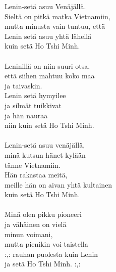 
Lenin-setä asuu Venäjällä. \\ Sieltä on pitkä matka Vietnamiin, \\ mutta minusta vain tuntuu, että \\ Lenin setä asuu yhtä lähellä \\ kuin setä Ho Tshi Minh. \\ \hspace{10mm} \\ Leninillä on niin suuri otsa, \\ että siihen mahtuu koko maa \\ ja taivaskin. \\ Lenin setä hymyilee \\ ja silmät tuikkivat \\ ja hän nauraa \\ niin kuin setä Ho Tshi Minh. \\ \hspace{10mm} \\ Lenin-setä asuu venäjällä, \\ minä kutsun hänet kylään \\ tänne Vietnamiin. \\ Hän rakastaa meitä, \\ meille hän on aivan yhtä kultainen \\ kuin setä Ho Tshi Minh. \\ \hspace{10mm} \\ Minä olen pikku pioneeri \\ ja vähäinen on vielä \\ minun voimani, \\ mutta pienikin voi taistella \\ :,: rauhan puolesta kuin Lenin \\ ja setä Ho Tshi Minh. :,:
